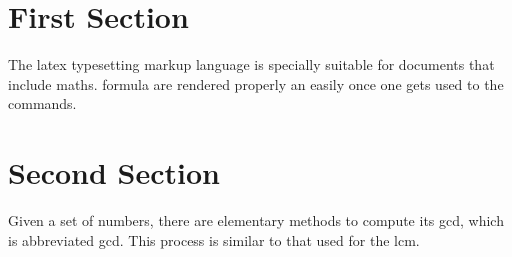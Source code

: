 \documentclass{article}
\begin{document}
\tableofcontents

\section{First Section}

The \Gls{latex} typesetting markup language is specially suitable for documents that include {maths}. {formula} are rendered properly an easily once one gets used to the commands.



\section{Second Section}

\vspace{5mm}

Given a set of numbers, there are elementary methods to compute its {gcd}, which is abbreviated {gcd}. This process is similar to that used for the {lcm}.



\printglossary


\printglossary[type=\acronymtype]
\end{document}
